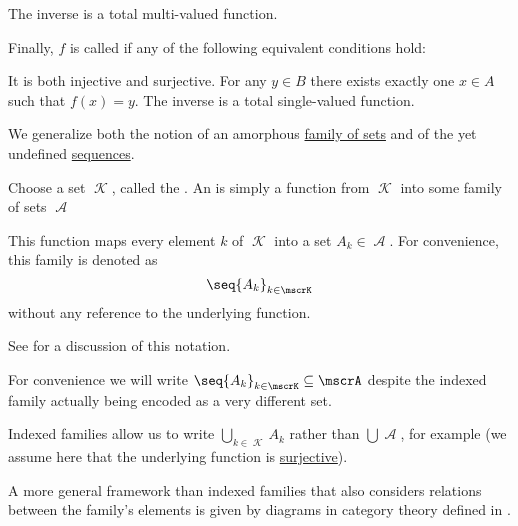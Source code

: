 \begin{definition}
\begin{thmenum}
\begin{minipage}[t]{0.44\textwidth}
\begin{thmenum}[leftmargin=0.9cm]
         The inverse is a total multi-valued function.
      \end{thmenum}
    \end{minipage}

     Finally, \( f \) is called  if any of the following equivalent conditions hold:
    \begin{thmenum}
       It is both injective and surjective.
       For any \( y \in B \) there exists exactly one \( x \in A \) such that \( f(x) = y \).
       The inverse is a total single-valued function.
    \end{thmenum}
  \end{thmenum}
\end{definition}

\begin{definition}\label{def:indexed_family}
  We generalize both the notion of an amorphous \hyperref[rem:family_of_sets]{family of sets} and of the yet undefined \hyperref[def:sequence]{sequences}.

  Choose a set \( \mscrK \), called the . An  is simply a function from \( \mscrK \) into some family of sets \( \mscrA \)

  This function maps every element \( k \) of \( \mscrK \) into a set \( A_k \in \mscrA \). For convenience, this family is denoted as
  \begin{equation*}
    \seq{ A_k }_{k \in \mscrK}
  \end{equation*}
  without any reference to the underlying function.

  See  for a discussion of this notation.

  For convenience we will write \( \seq{ A_k }_{k \in \mscrK} \subseteq \mscrA \) despite the indexed family actually being encoded as a very different set.

  Indexed families allow us to write \( \bigcup_{k \in \mscrK} A_k \) rather than \( \bigcup \mscrA \), for example (we assume here that the underlying function is \hyperref[def:function_invertibility/surjective]{surjective}).

  A more general framework than indexed families that also considers relations between the family's elements is given by diagrams in category theory defined in .
\end{definition}


